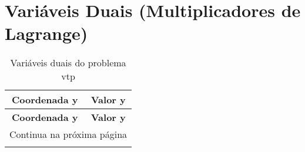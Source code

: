 \documentclass[12pt]{article}
\begin{document}
\section{Variáveis Duais (Multiplicadores de Lagrange)}

\begin{longtable}{@{}cc@{}}
\caption{Variáveis duais do problema vtp} \\
\toprule
\textbf{Coordenada y} & \textbf{Valor y} \\
\midrule
\endfirsthead

\toprule
\textbf{Coordenada y} & \textbf{Valor y} \\
\midrule
\endhead

\midrule \multicolumn{2}{r}{{Continua na próxima página}} \\ \midrule
\endfoot


\end{longtable}
\end{document}
